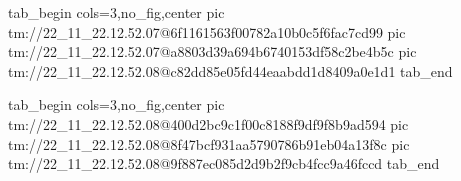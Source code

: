  
 
 
 
 

\qqSecCmtScr


\ifcmt
  tab_begin cols=3,no_fig,center
    pic tm://22_11_22.12.52.07@6f1161563f00782a10b0c5f6fac7cd99
    pic tm://22_11_22.12.52.07@a8803d39a694b6740153df58c2be4b5c
    pic tm://22_11_22.12.52.08@c82dd85e05fd44eaabdd1d8409a0e1d1
  tab_end
\fi


\ifcmt
  tab_begin cols=3,no_fig,center
    pic tm://22_11_22.12.52.08@400d2bc9c1f00c8188f9df9f8b9ad594
    pic tm://22_11_22.12.52.08@8f47bcf931aa5790786b91eb04a13f8c
    pic tm://22_11_22.12.52.08@9f887ec085d2d9b2f9cb4fcc9a46fccd
  tab_end
\fi

